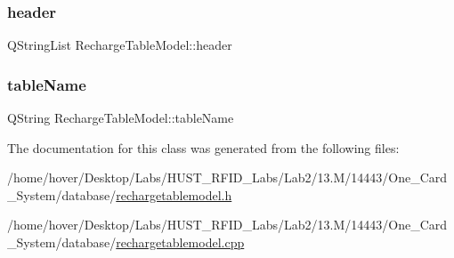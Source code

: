\subsubsection{\texorpdfstring{header}{header}}
{\footnotesize\ttfamily Q\+String\+List Recharge\+Table\+Model\+::header\hspace{0.3cm}{\ttfamily [private]}}

\mbox{\label{class_recharge_table_model_a710733d9714fdf177f2f31507c42180c}} 
\subsubsection{\texorpdfstring{tableName}{tableName}}
{\footnotesize\ttfamily Q\+String Recharge\+Table\+Model\+::table\+Name\hspace{0.3cm}{\ttfamily [private]}}



The documentation for this class was generated from the following files\+:\begin{DoxyCompactItemize}
\item 
/home/hover/\+Desktop/\+Labs/\+H\+U\+S\+T\+\_\+\+R\+F\+I\+D\+\_\+\+Labs/\+Lab2/13.\+M/14443/\+One\+\_\+\+Card\+\_\+\+System/database/\mbox{\hyperlink{rechargetablemodel_8h}{rechargetablemodel.\+h}}\item 
/home/hover/\+Desktop/\+Labs/\+H\+U\+S\+T\+\_\+\+R\+F\+I\+D\+\_\+\+Labs/\+Lab2/13.\+M/14443/\+One\+\_\+\+Card\+\_\+\+System/database/\mbox{\hyperlink{rechargetablemodel_8cpp}{rechargetablemodel.\+cpp}}\end{DoxyCompactItemize}
